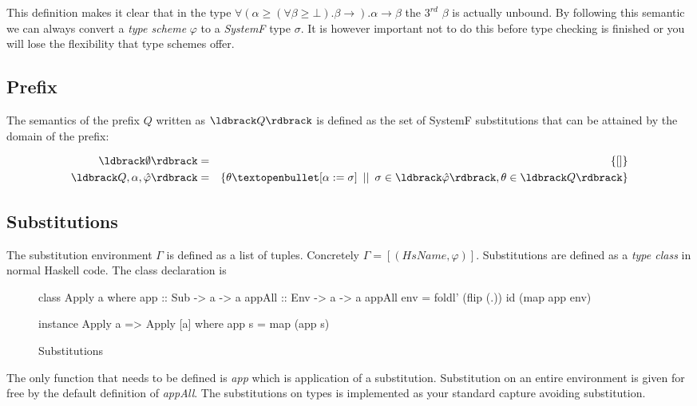 This definition makes it clear that in the type $\forall(\alpha \geq (\forall \beta \geq \bot). \beta \rightarrow ). \alpha \rightarrow \beta$ the $3^{rd}$ $\beta$ is actually unbound. By following this semantic we can always convert a \emph{type scheme} $\varphi$ to a \emph{SystemF} type $\sigma$. It is however important not to do this before type checking is finished or you will lose the flexibility that type schemes offer.
\subsection{Prefix}
The semantics of the prefix $Q$ written as $\br{Q}$  is defined as the set of SystemF substitutions that can be attained by the domain of the prefix:

\begin{eqnarray*}
\br{\emptyset} & = & \{\lbrack\rbrack\} \\
\br{Q, \alpha, \hat{\varphi}} & = & \{ \theta \textopenbullet \lbrack \alpha := \sigma \rbrack \hspace{5pt} || \hspace{5pt} \sigma \in \br{\hat{\varphi}}, \theta \in \br{Q} \}
\end{eqnarray*}
\subsection{Substitutions}
The substitution environment $\Gamma$ is defined as a list of tuples. Concretely $\Gamma = [(HsName,\varphi)]$. Substitutions are defined as a \emph{type class} in normal Haskell code. The class declaration is

\begin{figure}[H]
\begin{code}
class Apply a where
  app    :: Sub -> a -> a
  appAll :: Env -> a -> a
  appAll env = foldl' (flip (.)) id (map app env)
  
instance Apply a => Apply [a] where
  app s = map (app s)
\end{code}
\label{utils:apply}
\caption{Substitutions}
\end{figure}
The only function that needs to be defined is \emph{app} which is application of a substitution. Substitution on an entire environment is given for free by the default definition of \emph{appAll}. 
The substitutions on types is implemented as your standard capture avoiding substitution.
